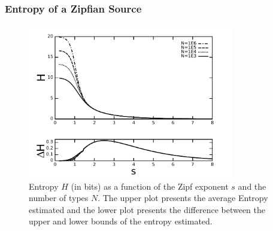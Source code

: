 \documentclass[notes]{beamer}
\begin{document}
\frame
{
  \frametitle{Entropy of a Zipfian Source}
  \vspace{-0.5cm}
  \begin{figure}[h]
  \centering
  \includegraphics[width=0.8\textwidth]{imagespresentation/entropy_N_s_limits_fulldh_pb2.pdf}
  \vspace{-0.2cm}
  \caption{\scriptsize Entropy $H$ (in bits) as a function of the Zipf exponent $s$ and the number of types $N$. The upper plot presents the average Entropy estimated and the lower plot presents the difference between the upper and lower bounds of the entropy estimated.}
  \label{fig:entropy_N_s}
  \end{figure}
}
\end{document}
